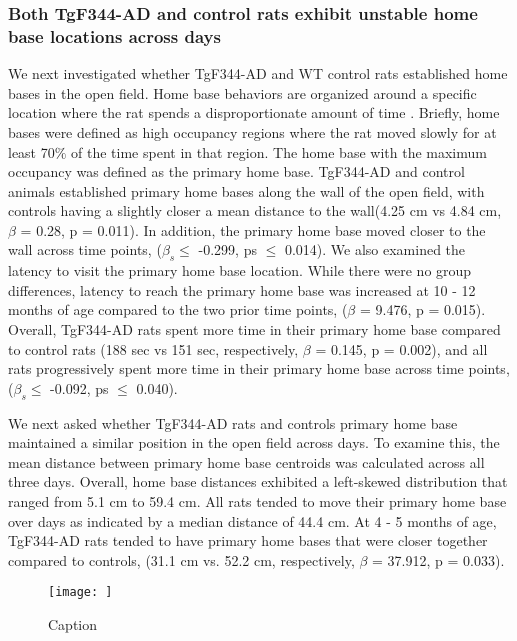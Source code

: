 \documentclass[fleqn,10pt]{wlscirep}
\begin{document}
\subsubsection*{Both TgF344-AD and control rats exhibit unstable home base locations across days}
We next investigated whether TgF344-AD and WT control rats established home bases in the open field. Home base behaviors are organized around a specific location where the rat spends a disproportionate amount of time \cite{tchernichovski_part_nodate}. Briefly, home bases were defined as high occupancy regions where the rat moved slowly for at least 70$\%$ of the time spent in that region. The home base with the maximum occupancy was defined as the primary home base. TgF344-AD and control animals established primary home bases along the wall of the open field, with controls having a slightly closer a mean distance to the wall(4.25 cm vs 4.84 cm, $\beta$ = 0.28, p = 0.011). In addition, the primary home base moved closer to the wall across time points, ($\beta_s \leq$ -0.299, ps $\leq$ 0.014). We also examined the latency to visit the primary home base location. While there were no group differences, latency to reach the primary home base was increased at 10 - 12 months of age compared to the two prior time points, ($\beta$ = 9.476, p = 0.015). Overall, TgF344-AD rats spent more time in their primary home base compared to control rats (188 sec vs 151 sec, respectively, $\beta$ = 0.145, p = 0.002), and all rats progressively spent more time in their primary home base across time points, ($\beta_s \leq$ -0.092, ps $\leq$ 0.040). 

We next asked whether TgF344-AD rats and controls primary home base maintained a similar position in the open field across days. To examine this, the mean distance between primary home base centroids was calculated across all three days. Overall, home base distances exhibited a left-skewed distribution that ranged from 5.1 cm to 59.4 cm. All rats tended to move their primary home base over days as indicated by a median distance of 44.4 cm. At 4 - 5 months of age, TgF344-AD rats tended to have primary home bases that were closer together compared to controls, (31.1 cm vs. 52.2 cm, respectively, $\beta$ = 37.912, p = 0.033). 

\begin{figure}
    \centering
    \texttt{[image: ]}
    \caption{Caption}
    \label{locomotor_fig}
\end{figure}
\end{document}
